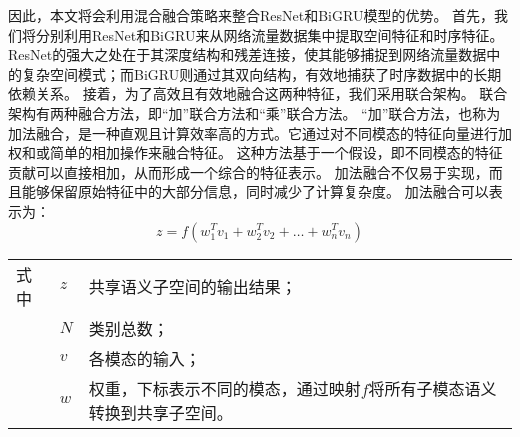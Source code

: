 因此，本文将会利用混合融合策略来整合ResNet和BiGRU模型的优势。
首先，我们将分别利用ResNet和BiGRU来从网络流量数据集中提取空间特征和时序特征。
ResNet的强大之处在于其深度结构和残差连接，使其能够捕捉到网络流量数据中的复杂空间模式；而BiGRU则通过其双向结构，有效地捕获了时序数据中的长期依赖关系。
接着，为了高效且有效地融合这两种特征，我们采用联合架构。
联合架构有两种融合方法，即“加”联合方法和“乘”联合方法。
“加”联合方法，也称为加法融合，是一种直观且计算效率高的方式。它通过对不同模态的特征向量进行加权和或简单的相加操作来融合特征。
这种方法基于一个假设，即不同模态的特征贡献可以直接相加，从而形成一个综合的特征表示。
加法融合不仅易于实现，而且能够保留原始特征中的大部分信息，同时减少了计算复杂度。
加法融合可以表示为：
\begin{equation}
	z = f(w_1^Tv_1 + w_2^Tv_2+ \dots + w_n^Tv_n)
\end{equation}
\begin{flushleft}
	\renewcommand\arraystretch{1.25}
	\begin{tabularx}{\textwidth}{@{}>{\normalsize\rm}l@{\quad}>{\normalsize\rm}l@{——}>{\normalsize\rm}X@{}}
		式中 & $z$ & 共享语义子空间的输出结果；                                              \\
		     & $N$ & 类别总数；                                                              \\
		     & $v$ & 各模态的输入；                                                          \\
		     & $w$ & 权重，下标表示不同的模态，通过映射$f$将所有子模态语义转换到共享子空间。 \\
	\end{tabularx}\vspace{.5ex}
\end{flushleft}


